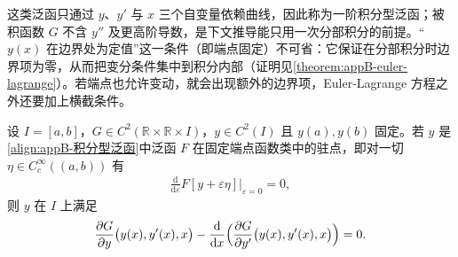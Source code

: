 \documentclass[../main.tex]{subfiles}
\begin{document}
\begin{remark}
这类泛函只通过 $y$、$y'$ 与 $x$ 三个自变量依赖曲线，因此称为一阶积分型泛函；被积函数 $G$ 不含 $y''$ 及更高阶导数，是下文推导能只用一次分部积分的前提。“$y(x)$ 在边界处为定值”这一条件（即端点固定）不可省：它保证在分部积分时边界项为零，从而把变分条件集中到积分内部（证明见\cref{theorem:appB-euler-lagrange}）。若端点也允许变动，就会出现额外的边界项，Euler-Lagrange 方程之外还要加上横截条件。
\end{remark}

\begin{theorem}\label{theorem:appB-euler-lagrange}
设 $I=[a,b]$，$G\in C^{2}(\mathbb{R}\times\mathbb{R}\times I)$，$y\in C^{2}(I)$ 且 $y(a),y(b)$ 固定。若 $y$ 是\eqref{align:appB-积分型泛函}中泛函 $F$ 在固定端点函数类中的驻点，即对一切 $\eta\in C_{c}^{\infty}((a,b))$ 有
\begin{align}
  \frac{\mathrm{d}}{\mathrm{d}\varepsilon}F[y+\varepsilon\eta]\Big|_{\varepsilon=0}=0,
  \label{align:appB-驻点条件}
\end{align}
则 $y$ 在 $I$ 上满足
\begin{align}
  \frac{\partial G}{\partial y}\bigl(y(x),y'(x),x\bigr)-\frac{\mathrm{d}}{\mathrm{d}x}\Bigl(\frac{\partial G}{\partial y'}\bigl(y(x),y'(x),x\bigr)\Bigr)=0.
  \label{align:appB-euler-lagrange}
\end{align}
\end{theorem}
\end{document}
